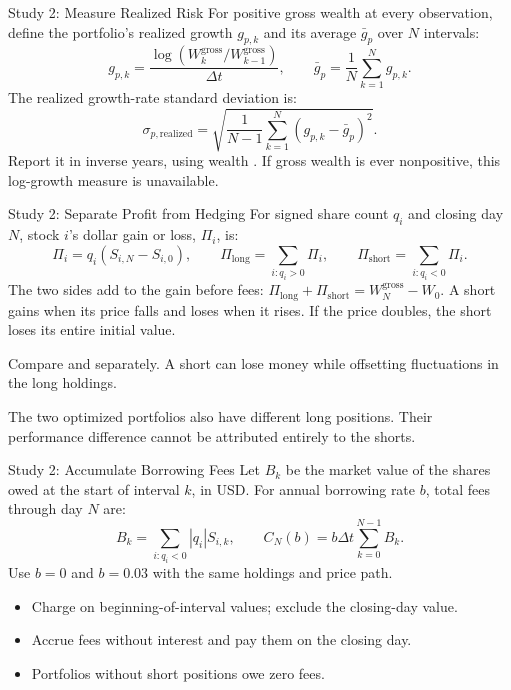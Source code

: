 \documentclass[aspectratio=169,11pt]{beamer}
\begin{document}
\begin{frame}{Study 2: Measure Realized Risk}
For positive gross wealth at every observation, define the portfolio's
realized growth $g_{p,k}$ and its average $\bar g_p$ over $N$ intervals:
\[
 g_{p,k}=\frac{\log(W_k^{\mathrm{gross}}/W_{k-1}^{\mathrm{gross}})}{\Delta t},
 \qquad
 \bar g_p=\frac1N\sum_{k=1}^N g_{p,k}.
\]
The realized growth-rate standard deviation is:
\[
 \sigma_{p,\mathrm{realized}}
 =\sqrt{\frac1{N-1}\sum_{k=1}^N(g_{p,k}-\bar g_p)^2}.
\]
Report it in inverse years, using wealth . If gross
wealth is ever nonpositive, this log-growth measure is unavailable.
\end{frame}

\begin{frame}{Study 2: Separate Profit from Hedging}
For signed share count $q_i$ and closing day $N$, stock $i$'s dollar gain or
loss, $\Pi_i$, is:
\[
 \Pi_i=q_i(S_{i,N}-S_{i,0}),
 \qquad
 \Pi_{\mathrm{long}}=\sum_{i:q_i>0}\Pi_i,
 \qquad
 \Pi_{\mathrm{short}}=\sum_{i:q_i<0}\Pi_i.
\]
The two sides add to the gain before fees:
$\Pi_{\mathrm{long}}+\Pi_{\mathrm{short}}=W_N^{\mathrm{gross}}-W_0$.
A short gains when its price falls and loses when it rises. If the price
doubles, the short loses its entire initial value.

\vspace{0.8em}
Compare  and  separately. A
short can lose money while offsetting fluctuations in the long holdings.

\vspace{0.8em}
The two optimized portfolios also have different long positions. Their
performance difference cannot be attributed entirely to the shorts.
\end{frame}

\begin{frame}{Study 2: Accumulate Borrowing Fees}
Let $B_k$ be the market value of the shares owed at the start of interval
$k$, in USD. For annual borrowing rate $b$, total fees through day $N$ are:
\[
 B_k=\sum_{i:q_i<0}|q_i|S_{i,k},
 \qquad
 C_N(b)=b\Delta t\sum_{k=0}^{N-1}B_k.
\]
Use $b=0$ and $b=0.03$ with the same holdings and price path.
\begin{itemize}\setlength{\itemsep}{0.5em}
\item Charge on beginning-of-interval values; exclude the closing-day value.
\item Accrue fees without interest and pay them on the closing day.
\item Portfolios without short positions owe zero fees.
\end{itemize}
\end{frame}
\end{document}
